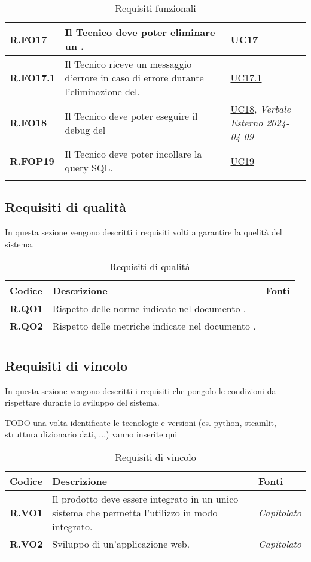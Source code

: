 \begin{longtable}{|P{3cm}|P{6,5cm}|>{\arraybackslash}P{4cm}|}
    \hline
    \textbf{R.FO17} & Il Tecnico deve poter eliminare un . &  \hyperref[UC17]{UC17}\\
    \hline
    \textbf{R.FO17.1} & Il Tecnico riceve un messaggio d'errore in caso di errore durante l'eliminazione del. &  \hyperref[UC17point1]{UC17.1}\\
    \hline
    \textbf{R.FO18} & Il Tecnico deve poter eseguire il debug del  &  \hyperref[UC18]{UC18}, \emph{Verbale Esterno 2024-04-09}\\
    \hline
    \textbf{R.FOP19} & Il Tecnico deve poter incollare la query SQL. &  \hyperref[UC19]{UC19}\\
    \hline
\caption{Requisiti funzionali}
\label{requisitifunzionali}
\end{longtable}

\subsection{Requisiti di qualità}
In questa sezione vengono descritti i requisiti volti a garantire la quelità del sistema.

\begin{longtable}{|P{3cm}|P{6,5cm}|>{\arraybackslash}P{4cm}|}
  \hline
  \textbf{Codice} & \textbf{Descrizione} & \textbf{Fonti} \\
  \hline
  \textbf{R.QO1} & Rispetto delle norme indicate nel documento \NdP{}. & \NdP{} \\
  \hline
  \textbf{R.QO2} & Rispetto delle metriche indicate nel documento \PdQ{}. & \NdP{} \\
  \hline
\caption{Requisiti di qualità}
\label{requisitiqualita}
\end{longtable}

\subsection{Requisiti di vincolo}
In questa sezione vengono descritti i requisiti che pongolo le condizioni da rispettare durante lo sviluppo del sistema.

TODO una volta identificate le tecnologie e versioni (es. python, steamlit, struttura dizionario dati, ...) vanno inserite qui
\begin{longtable}{|P{3cm}|P{6,5cm}|>{\arraybackslash}P{4cm}|}
  \hline
  \textbf{Codice} & \textbf{Descrizione} & \textbf{Fonti} \\
  \hline
  \textbf{R.VO1} & Il prodotto deve essere integrato in un unico sistema che permetta l'utilizzo in modo integrato. & \emph{Capitolato} \\
  \hline
  \textbf{R.VO2} & Sviluppo di un'applicazione web. & \emph{Capitolato} \\
  \hline
\caption{Requisiti di vincolo}
\label{requisitivincolo}
\end{longtable}

